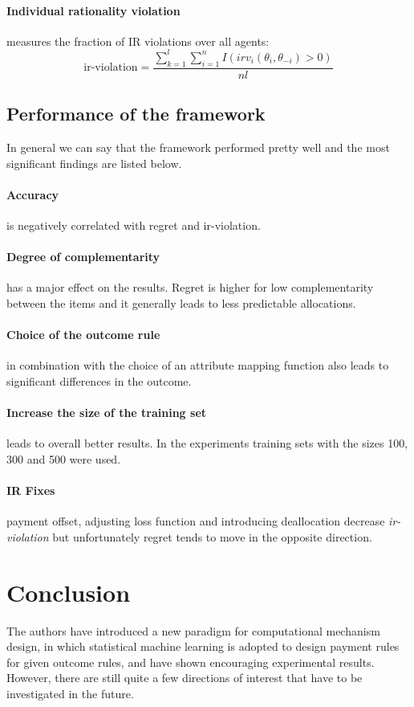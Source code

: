 \documentclass[]{article}
\begin{document}
\paragraph{Individual rationality violation} measures the fraction of IR violations over all agents:
\begin{equation*}
\text{ir-violation} =  \frac{\sum_{k=1}^{l}\sum_{i=1}^{n}I(irv_{i}(\theta_{i},\theta_{-i})>0)}{nl}
\end{equation*}

\subsection{Performance of the framework}

In general we can say that the framework performed pretty well and the most significant findings are listed below.

\paragraph{Accuracy} is negatively correlated with regret and ir-violation.

\paragraph{Degree of complementarity} has a major effect on the results. Regret is higher for low complementarity between the items and it generally leads to less predictable allocations.

\paragraph{Choice of the outcome rule} in combination with the choice of an attribute mapping function also leads to significant differences in the outcome.

\paragraph{Increase the size of the training set}  leads to overall better results. In the experiments training sets with the sizes 100, 300 and 500 were used.

\paragraph{IR Fixes} payment offset, adjusting loss function and introducing deallocation decrease \emph{ir-violation} but unfortunately regret tends to move in the opposite direction.


\section{Conclusion}
The authors have introduced a new paradigm for computational mechanism design, in which statistical machine learning is adopted to design payment rules for given outcome rules, and have shown encouraging experimental results. However, there are still quite a few directions of interest that have to be investigated in the future.
\end{document}
